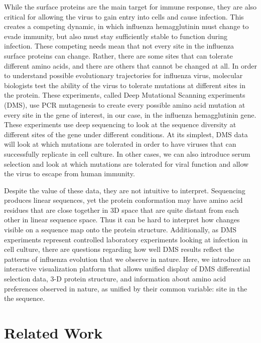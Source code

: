 \documentclass[sigchi]{acmart}
\begin{document}
While the surface proteins are the main target for immune response, they are also critical for allowing the virus to gain entry into cells and cause infection. This creates a competing dynamic, in which influenza hemagglutinin must change to evade immunity, but also must stay sufficiently stable to function during infection. These competing needs mean that not every site in the influenza surface proteins can change. Rather, there are some sites that can tolerate different amino acids, and there are others that cannot be changed at all. In order to understand possible evolutionary trajectories for influenza virus, molecular biologists test the ability of the virus to tolerate mutations at different sites in the protein. These experiments, called Deep Mutational Scanning experiments (DMS), use PCR mutagenesis to create every possible amino acid mutation at every site in the gene of interest, in our case, in the influenza hemagglutinin gene. These experiments use deep sequencing to look at the sequence diversity at different sites of the gene under different conditions. At its simplest, DMS data will look at which mutations are tolerated in order to have viruses that can successfully replicate in cell culture. In other cases, we can also introduce serum selection and look at which mutations are tolerated for viral function and allow the virus to escape from human immunity.

Despite the value of these data, they are not intuitive to interpret. Sequencing produces linear sequences, yet the protein conformation may have amino acid residues that are close together in 3D space that are quite distant from each other in linear sequence space. Thus it can be hard to interpret how changes visible on a sequence map onto the protein structure. Additionally, as DMS experiments represent controlled laboratory experiments looking at infection in cell culture, there are questions regarding how well DMS results reflect the patterns of influenza evolution that we observe in nature. Here, we introduce an interactive visualization platform that allows unified display of DMS differential selection data, 3-D protein structure, and information about amino acid preferences observed in nature, as unified by their common variable: site in the the sequence.

\section{Related Work}
\end{document}
